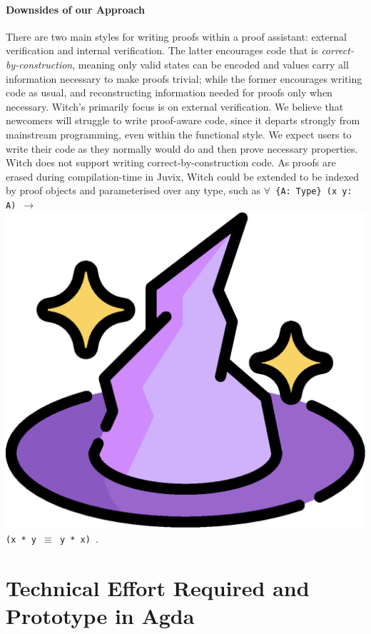 \documentclass[sigconfl]{acmart}
\begin{document}
\paragraph{Downsides of our Approach}
There are two main styles for writing proofs within a proof assistant: external
verification and internal verification. The latter encourages code
that is \textit{correct-by-construction}, meaning only valid states can be
encoded and values carry all information necessary to make proofs trivial; while
the former encourages writing code as usual, and reconstructing information
needed for proofs only when necessary.
Witch's primarily focus is on external verification. We believe that newcomers
will struggle to write proof-aware code, since it departs strongly from
mainstream programming, even within the functional style. We expect users to
write their code as they normally would do and then prove necessary properties.
Witch does not support writing correct-by-construction code. As proofs
are erased during compilation-time in Juvix, Witch could be extended
to be indexed by proof objects and parameterised over any type, such as
\texttt{$\forall $ \{A: Type\} (x y: A) $\rightarrow$ }
\includegraphics[height=0.02\textheight]{image/hat.eps} \texttt{ (x * y $\equiv$
  y * x) }.


\section{Technical Effort Required and Prototype in Agda} \label{tech-details}
\end{document}
